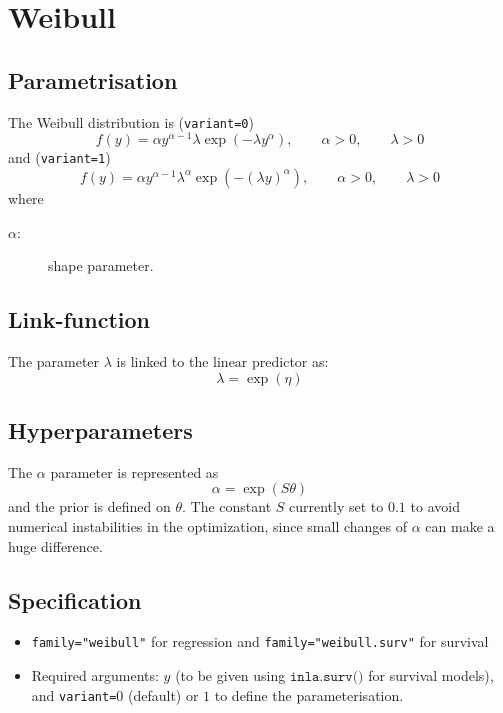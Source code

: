 \documentclass[a4paper,11pt]{article}
\begin{document}
\section*{Weibull}

\subsection*{Parametrisation}

The Weibull distribution is (\texttt{variant=0})
\begin{displaymath}
    f(y) = \alpha y^{\alpha-1}
    \lambda\exp( - \lambda  y^{\alpha}),
    \qquad \alpha>0, \qquad \lambda>0
\end{displaymath}
and (\texttt{variant=1})
\begin{displaymath}
    f(y) = \alpha y^{\alpha-1}
    \lambda^{\alpha}\exp( - (\lambda  y)^{\alpha}),
    \qquad \alpha>0, \qquad \lambda>0
\end{displaymath}
where
\begin{description}
\item[$\alpha$:] shape parameter.
\end{description}

\subsection*{Link-function}

The parameter $\lambda$ is linked to the linear predictor as:
\[
    \lambda = \exp(\eta)
\]
\subsection*{Hyperparameters}

The $\alpha$ parameter is represented as
\[
    \alpha = \exp(S\theta)
\]
and the prior is defined on $\theta$. The constant $S$ currently set
to $0.1$ to avoid numerical instabilities in the optimization, since
small changes of $\alpha$ can make a huge difference.

\subsection*{Specification}

\begin{itemize}
\item \texttt{family="weibull"} for regression and
 \texttt{family="weibull.surv"} for survival
\item Required arguments: $y$ (to be given using
    $\texttt{inla.surv()}$ for survival models), and
    \texttt{variant=}$0$ (default) or $1$ to define the
    parameterisation.
\end{itemize}
\end{document}
